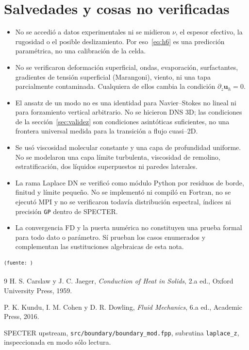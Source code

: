 \documentclass[11pt,a4paper]{article}
\newcommand{\src}[1]{\textsuperscript{\texttt{(fuente: \detokenize{#1})}}}
\begin{document}
\section{Salvedades y cosas no verificadas}
\label{sec:salvedades}

\begin{itemize}
\item No se accedió a datos experimentales ni se midieron \(\nu\), el espesor
  efectivo, la rugosidad o el posible deslizamiento. Por eso~\eqref{eq:h6} es una
  predicción paramétrica, no una calibración de la celda.
\item No se verificaron deformación superficial, ondas, evaporación, surfactantes,
  gradientes de tensión superficial (Marangoni), viento, ni una tapa parcialmente
  contaminada. Cualquiera de ellos cambia la condición \(\partial_z\boldsymbol u_h=0\).
\item El ansatz de un modo no es una identidad para Navier--Stokes no lineal ni para
  forzamiento vertical arbitrario. No se hicieron DNS 3D; las condiciones de la
  sección~\ref{sec:validez} son condiciones asintóticas suficientes, no una frontera
  universal medida para la transición a flujo cuasi--2D.
\item Se usó viscosidad molecular constante y una capa de profundidad uniforme. No
  se modelaron una capa límite turbulenta, viscosidad de remolino, estratificación,
  dos líquidos superpuestos ni paredes laterales.
\item La rama Laplace DN se verificó como módulo Python por residuos de borde,
  finitud y límite pequeño. No se implementó ni compiló en Fortran, no se ejecutó
  MPI y no se verificaron todavía distribución espectral, índices ni precisión
  \texttt{GP} dentro de SPECTER.
\item La convergencia FD y la puerta numérica no constituyen una prueba formal para
  todo dato o parámetro. Sí prueban los casos enumerados y complementan las
  sustituciones algebraicas de esta nota.
\end{itemize}
\src{salvedades}

\begin{thebibliography}{9}
H. S. Carslaw y J. C. Jaeger,
\emph{Conduction of Heat in Solids}, 2.a ed., Oxford University Press, 1959.

P. K. Kundu, I. M. Cohen y D. R. Dowling,
\emph{Fluid Mechanics}, 6.a ed., Academic Press, 2016.

SPECTER upstream, \texttt{src/boundary/boundary\_mod.fpp}, subrutina
\texttt{laplace\_z}, inspeccionada en modo sólo lectura.
\end{thebibliography}
\end{document}
